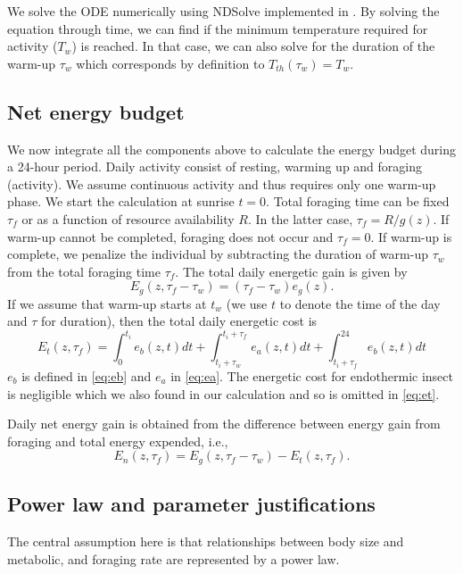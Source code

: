 We solve the ODE numerically using NDSolve implemented in \citet{Mathematica10}.
By solving the equation through time, we can find if the minimum temperature  required for activity ($T_w$) is reached. %
In that case, we can also solve for the duration of the warm-up $\tau_w$ which corresponds by definition to $T_{th}(\tau_w) = T_w$. 


 \subsection*{Net energy budget}
We now integrate all the components above to calculate  the energy budget during a 24-hour period.
Daily activity consist of resting, warming up and foraging (activity).
We assume continuous activity and thus requires only one warm-up phase.
We start the calculation at sunrise $t = 0$.
Total foraging time can be fixed $\tau_f$ or as a function of resource availability $R$. 
In the latter case, $\tau_f = R/g(z)$.
If warm-up cannot be completed, foraging does not occur and $\tau_f = 0$.
If warm-up is complete, we penalize the individual by subtracting the duration of warm-up $\tau_w$ from the total foraging time $\tau_f$. 
The total daily energetic gain is given by
\[
	E_g(z,\tau_f - \tau_w) = (\tau_f - \tau_w) e_g(z).
\]
%
If we assume that warm-up starts at $t_w$ (we use $t$ to denote the time of the day and $\tau$ for duration), then the total daily  energetic cost is
\begin{equation} \label{eq:et}
	E_t(z, \tau_f) = \int_0^{t_i} e_b(z, t) dt + \int_{t_i + \tau_w}^{t_i + \tau_f } e_a(z,t) dt + \int_{t_i+\tau_f}^{24} e_b(z, t) dt 
\end{equation}
$e_b$ is defined in \cref{eq:eb}  and $e_a$ in \cref{eq:ea}.
The energetic cost for endothermic insect is negligible \citep{Heinrich1975} which we also found in our calculation and so is omitted in \cref{eq:et}.  

Daily net energy gain is obtained from the  difference between energy gain from foraging and total energy expended, i.e.,
\[ 
	E_n(z, \tau_f) = E_g(z,\tau_f- \tau_w) - E_t(z, \tau_f).
\]

\subsection*{Power law and parameter justifications}
The central assumption here is that relationships between body size and metabolic, and foraging rate are represented by a power law.

